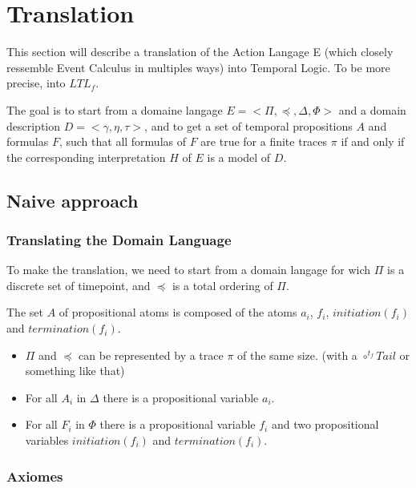 \section{Translation}\label{sec:translation}

This section will describe a translation of the Action Langage E (which closely ressemble Event Calculus in multiples ways) into Temporal Logic.
To be more precise, into $LTL_f$.

The goal is to start from a domaine langage $E=<\Pi,\preceq,\Delta,\Phi>$ and a domain description $D=<\gamma,\eta,\tau>$, and to get a set of temporal propositions $A$ and formulas $F$, such that all formulas of $F$ are true for a finite traces $\pi$ if and only if the corresponding interpretation $H$ of $E$ is a model of $D$.

\subsection{Naive approach}

\subsubsection{Translating the Domain Language}

To make the translation, we need to start from a domain langage for wich $\Pi$ is a discrete set of timepoint, and $\preceq$ is a total ordering of $\Pi$.

The set $A$ of propositional atoms is composed of the atoms $a_i$, $f_i$, $initiation(f_i)$ and $termination(f_i)$.

\begin{itemize}
  \item $\Pi$ and $\preceq$ can be represented by a trace $\pi$ of the same size. (with a $\circ^{t_f}Tail$ or something like that)
  \item For all $A_i$ in $\Delta$ there is a propositional variable $a_i$.
  \item For all $F_i$ in $\Phi$ there is a propositional variable $f_i$ and two propositional variables $initiation(f_i)$ and $termination(f_i)$.
\end{itemize}

\subsubsection{Axiomes}


